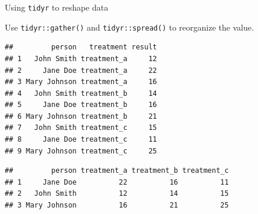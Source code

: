 \documentclass[14pt,ignorenonframetext,]{bredelebeamer}
\newenvironment{Shaded}{\begin{snugshade}}{\end{snugshade}}
\newcommand{\KeywordTok}[1]{\textcolor[rgb]{0.94,0.87,0.69}{#1}}
\newcommand{\DataTypeTok}[1]{\textcolor[rgb]{0.87,0.87,0.75}{#1}}
\newcommand{\DecValTok}[1]{\textcolor[rgb]{0.86,0.86,0.80}{#1}}
\newcommand{\StringTok}[1]{\textcolor[rgb]{0.80,0.58,0.58}{#1}}
\newcommand{\OperatorTok}[1]{\textcolor[rgb]{0.94,0.94,0.82}{#1}}
\newcommand{\NormalTok}[1]{\textcolor[rgb]{0.80,0.80,0.80}{#1}}
\begin{document}
\begin{frame}[fragile]{Using \texttt{tidyr} to reshape data}

Use \texttt{tidyr::gather()} and \texttt{tidyr::spread()} to reorganize
the value.

\begin{Shaded}
\end{Shaded}

\begin{verbatim}
##         person   treatment result
## 1   John Smith treatment_a     12
## 2     Jane Doe treatment_a     22
## 3 Mary Johnson treatment_a     16
## 4   John Smith treatment_b     14
## 5     Jane Doe treatment_b     16
## 6 Mary Johnson treatment_b     21
## 7   John Smith treatment_c     15
## 8     Jane Doe treatment_c     11
## 9 Mary Johnson treatment_c     25
\end{verbatim}

\begin{Shaded}
\end{Shaded}

\begin{verbatim}
##         person treatment_a treatment_b treatment_c
## 1     Jane Doe          22          16          11
## 2   John Smith          12          14          15
## 3 Mary Johnson          16          21          25
\end{verbatim}

\end{frame}
\end{document}
